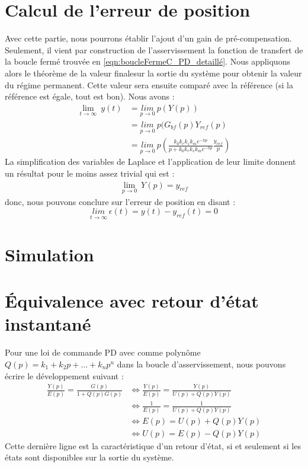 \section{Calcul de l'erreur de position} 
Avec cette partie, nous pourrons établir l'ajout d'un gain de pré-compensation. Seulement, il vient par construction de l'asservissement la fonction de transfert de la boucle fermé trouvée en \ref{eqn:boucleFermeC_PD_detaillé}. Nous appliquons alors le théorème de la valeur finalesur la sortie du système pour obtenir la valeur du régime permanent. Cette valeur sera ensuite comparé avec la référence (si la référence est égale, tout est bon). Nous avons :
\begin{align*}
\underset{t\rightarrow \infty}{\lim}\ y(t) 	&= \underset{ p\rightarrow 0 }{lim} \ p(Y(p))\\
  											&= \underset{p\rightarrow 0}{lim}\ p(G_{bf}(p)Y_{ref}(p)\\
  											&= \underset{p\rightarrow 0}{lim}\ p \left(\frac{k_0k_rk_sk_me^{-hp}}{p+k_0k_rk_sk_me^{-hp}} \frac{y_{ref}}{p}\right)
\end{align*}
La simplification des variables de Laplace et l'application de leur limite donnent un résultat pour le moins assez trivial qui est :
\begin{align*}
\underset{p\rightarrow 0}{\lim}\ Y(p) = y_{ref}
\end{align*}
donc, nous pouvons conclure sur l'erreur de position en disant : 
\begin{equation}
\underset{t \rightarrow \infty}{lim}\ \epsilon(t) = y(t) - y_{ref}(t) = 0
\end{equation}

\section{Simulation}


\section{Équivalence avec retour d'état instantané}
Pour une loi de commande PD avec comme polynôme $Q(p) = k_1+k_2p+...+k_np^n$ dans la boucle d'asservissement, nous pouvons écrire le développement suivant : 
\begin{align*}
\frac{Y(p)}{E(p)} = \frac{G(p)}{1 + Q(p)G(p)} & \Leftrightarrow \frac{Y(p)}{E(p)} = \frac{Y(p)}{U(p) + Q(p)Y(p)}\\
&\Leftrightarrow \frac{1}{E(p)} = \frac{1}{U(p) + Q(p)Y(p)} \\
& \Leftrightarrow E(p) = U(p) + Q(p)Y(p)\\
& \Leftrightarrow U(p) = E(p) - Q(p)Y(p)
\end{align*} 
Cette dernière ligne est la caractéristique d'un retour d'état, si et seulement si les états sont disponibles sur la sortie du système.